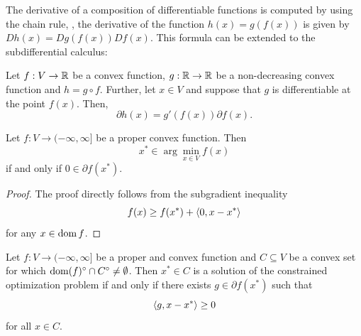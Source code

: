 The derivative of a composition of differentiable functions is computed by using the chain rule, \ie, the derivative of the function $h(x) = g(f(x))$ is given by $D h(x) = Dg(f(x))Df(x)$.
This formula can be extended to the subdifferential calculus:
\begin{theorem}
    Let $f:V\rightarrow \mathbb{R}$ be a convex function, $g:\mathbb{R}\rightarrow \mathbb{R}$ be a non-decreasing convex function and $h=g\circ f$.
    Further, let $x\in V$ and suppose that $g$ is differentiable at the point $f(x)$.
    Then,
    \[
        \partial h(x)= g'(f(x))\partial f(x).
    \]
\end{theorem}

\begin{theorem}
    Let $f:V\to(-\infty, \infty]$ be a proper convex function. Then
    \[
        x^\ast\in\arg\min_{x\in V} f(x)
    \]
    if and only if $0\in\partial f(x^\ast)$.
\end{theorem}
\begin{proof}
    The proof directly follows from the subgradient inequality
    \[
        f(x)\geq f(x^\ast)+\left\langle0 , x-x^\ast\right\rangle
    \]
    for any $x\in\operatorname{\mathrm{dom}} f$.
\end{proof}

\begin{theorem}
    Let $f:V\rightarrow(-\infty,\infty]$ be a proper and convex function and $C\subseteq V$ be a convex set for which $\operatorname{\mathrm{dom}}(f)^\circ\cap C^\circ \neq\emptyset$.
    Then $x^\ast\in C$ is a solution of the constrained optimization problem if and only if
    there exists $g\in \partial f(x^\ast)$ such that
    \[
        \left\langle g , x-x^\ast\right\rangle\geq 0
    \]
    for all $x\in C$.
\end{theorem}


